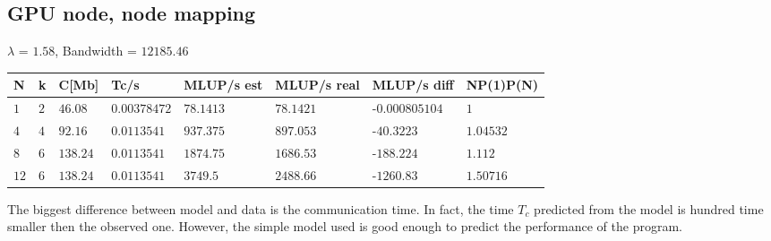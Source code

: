 \documentclass[11pt,a4paper]{article}
\begin{document}
\subsection*{GPU node, node mapping}
$\lambda$ = $1.58$, Bandwidth = $12185.46$
\begin{table}[H]
    \centering
    \begin{tabular}{|l|l|l|l|l|l|l|l|}
    \toprule
    N 		& k 	& C[Mb] 	& Tc/s 			& MLUP/s est 	& MLUP/s real 	& MLUP/s diff  & NP(1)P(N) \\
    \midrule
    $1$ 	& $2$ 	& $46.08$ 	& $0.00378472$ 	& $78.1413$ 	& $78.1421$ 	&-$0.000805104$ & $1$ \\
    $4$ 	& $4$ 	& $92.16$ 	& $0.0113541$ 	& $937.375$ 	& $897.053$ 		&-$40.3223$ & $1.04532$ \\
    $8$ 	& $6$ 	& $138.24$ 	& $0.0113541$ 	& $1874.75$ 	& $1686.53$ 	&-$188.224$ & $1.112$ \\
    $12$ 	& $6$ 	& $138.24$ 	& $0.0113541$ 	& $3749.5$ 		& $2488.66$ 	&-$1260.83$ & $1.50716$ \\
    \bottomrule
    \end{tabular}
\end{table}
The biggest difference between model and data is the communication time. In fact, the time $T_c$ predicted from the model is hundred time smaller then the observed one. However, the simple model used is good enough to predict the performance of the program. 
\end{document}
